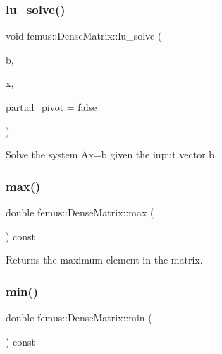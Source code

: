 \subsubsection{\texorpdfstring{lu\+\_\+solve()}{lu\_solve()}}
{\footnotesize\ttfamily void femus\+::\+Dense\+Matrix\+::lu\+\_\+solve (\begin{DoxyParamCaption}\item[{\mbox{\hyperlink{classfemus_1_1_dense_vector}{Dense\+Vector}} \&}]{b,  }\item[{\mbox{\hyperlink{classfemus_1_1_dense_vector}{Dense\+Vector}} \&}]{x,  }\item[{const bool}]{partial\+\_\+pivot = {\ttfamily false} }\end{DoxyParamCaption})}



Solve the system Ax=b given the input vector b. 

\mbox{\label{classfemus_1_1_dense_matrix_a2226f9ae3cbf21779e203679b7cd00ff}} 
\subsubsection{\texorpdfstring{max()}{max()}}
{\footnotesize\ttfamily double femus\+::\+Dense\+Matrix\+::max (\begin{DoxyParamCaption}{ }\end{DoxyParamCaption}) const\hspace{0.3cm}{\ttfamily [inline]}}

\begin{DoxyReturn}{Returns}
the maximum element in the matrix. 
\end{DoxyReturn}
\mbox{\label{classfemus_1_1_dense_matrix_a23726badca26256789e356c66a144727}} 
\subsubsection{\texorpdfstring{min()}{min()}}
{\footnotesize\ttfamily double femus\+::\+Dense\+Matrix\+::min (\begin{DoxyParamCaption}{ }\end{DoxyParamCaption}) const\hspace{0.3cm}{\ttfamily [inline]}}



